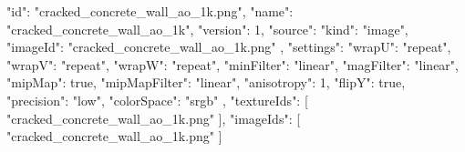 {
  "id": "cracked_concrete_wall_ao_1k.png",
  "name": "cracked_concrete_wall_ao_1k",
  "version": 1,
  "source": {
    "kind": "image",
    "imageId": "cracked_concrete_wall_ao_1k.png"
  },
  "settings": {
    "wrapU": "repeat",
    "wrapV": "repeat",
    "wrapW": "repeat",
    "minFilter": "linear",
    "magFilter": "linear",
    "mipMap": true,
    "mipMapFilter": "linear",
    "anisotropy": 1,
    "flipY": true,
    "precision": "low",
    "colorSpace": "srgb"
  },
  "textureIds": [
    "cracked_concrete_wall_ao_1k.png"
  ],
  "imageIds": [
    "cracked_concrete_wall_ao_1k.png"
  ]
}
